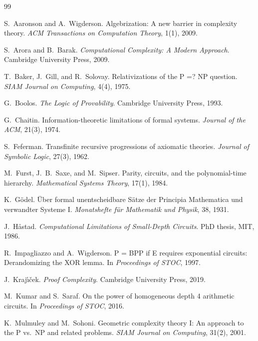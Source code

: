 \documentclass[11pt,a4paper]{article}
\theoremstyle{plain}
\theoremstyle{definition}
\theoremstyle{remark}
\begin{document}
\begin{thebibliography}{99}

S.~Aaronson and A.~Wigderson.
\newblock Algebrization: A new barrier in complexity theory.
\newblock \emph{ACM Transactions on Computation Theory}, 1(1), 2009.

S.~Arora and B.~Barak.
\newblock \emph{Computational Complexity: A Modern Approach}.
\newblock Cambridge University Press, 2009.

T.~Baker, J.~Gill, and R.~Solovay.
\newblock Relativizations of the P =? NP question.
\newblock \emph{SIAM Journal on Computing}, 4(4), 1975.

G.~Boolos.
\newblock \emph{The Logic of Provability}.
\newblock Cambridge University Press, 1993.

G.~Chaitin.
\newblock Information-theoretic limitations of formal systems.
\newblock \emph{Journal of the ACM}, 21(3), 1974.

S.~Feferman.
\newblock Transfinite recursive progressions of axiomatic theories.
\newblock \emph{Journal of Symbolic Logic}, 27(3), 1962.

M.~Furst, J.~B.~Saxe, and M.~Sipser.
\newblock Parity, circuits, and the polynomial-time hierarchy.
\newblock \emph{Mathematical Systems Theory}, 17(1), 1984.

K.~G\"{o}del.
\newblock \"{U}ber formal unentscheidbare S\"{a}tze der Principia Mathematica und verwandter Systeme I.
\newblock \emph{Monatshefte f\"{u}r Mathematik und Physik}, 38, 1931.

J.~H\r{a}stad.
\newblock \emph{Computational Limitations of Small-Depth Circuits}.
\newblock PhD thesis, MIT, 1986.

R.~Impagliazzo and A.~Wigderson.
\newblock P = BPP if E requires exponential circuits: Derandomizing the XOR lemma.
\newblock In \emph{Proceedings of STOC}, 1997.

J.~Kraj\'{\i}\v{c}ek.
\newblock \emph{Proof Complexity}.
\newblock Cambridge University Press, 2019.

M.~Kumar and S.~Saraf.
\newblock On the power of homogeneous depth 4 arithmetic circuits.
\newblock In \emph{Proceedings of STOC}, 2016.

K.~Mulmuley and M.~Sohoni.
\newblock Geometric complexity theory I: An approach to the P vs.\ NP and related problems.
\newblock \emph{SIAM Journal on Computing}, 31(2), 2001.


\end{thebibliography}
\end{document}
